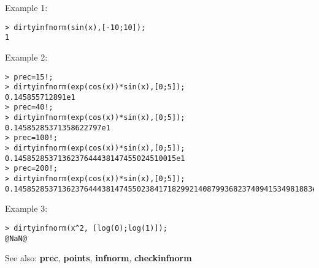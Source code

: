\noindent Example 1: 
\begin{center}\begin{minipage}{15cm}\begin{Verbatim}[frame=single]
> dirtyinfnorm(sin(x),[-10;10]);
1
\end{Verbatim}
\end{minipage}\end{center}
\noindent Example 2: 
\begin{center}\begin{minipage}{15cm}\begin{Verbatim}[frame=single]
> prec=15!;
> dirtyinfnorm(exp(cos(x))*sin(x),[0;5]);
0.145855712891e1
> prec=40!;
> dirtyinfnorm(exp(cos(x))*sin(x),[0;5]);
0.14585285371358622797e1
> prec=100!;
> dirtyinfnorm(exp(cos(x))*sin(x),[0;5]);
0.1458528537136237644438147455024510015e1
> prec=200!;
> dirtyinfnorm(exp(cos(x))*sin(x),[0;5]);
0.14585285371362376444381474550238417182992140879936823740941534981883e1
\end{Verbatim}
\end{minipage}\end{center}
\noindent Example 3: 
\begin{center}\begin{minipage}{15cm}\begin{Verbatim}[frame=single]
> dirtyinfnorm(x^2, [log(0);log(1)]);
@NaN@
\end{Verbatim}
\end{minipage}\end{center}
See also: \textbf{prec}, \textbf{points}, \textbf{infnorm}, \textbf{checkinfnorm}
